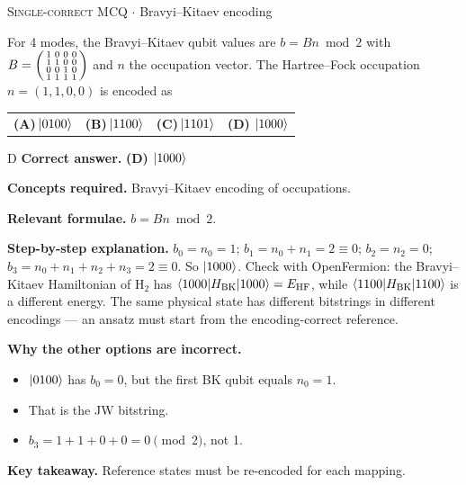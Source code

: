 \documentclass[11pt,a4paper]{article}
\newcommand{\optlabel}[1]{\textbf{(#1)}}
\newcommand{\correctlabel}[1]{\textcolor{okgreen}{\textbf{(#1)}\,\ding{51}}}
\newenvironment{qitem}[1]{\begin{list}{}{\setlength{\leftmargin}{3.3em}\setlength{\labelwidth}{3.1em}%
  \setlength{\labelsep}{0.2em}\setlength{\topsep}{3pt}\setlength{\parsep}{3pt}}\item[\textbf{Q.#1}\hfill]}{\end{list}}
\newcommand{\qsep}{\par\vspace{2pt}{\color{black!15}\hrule}\vspace{4pt}}
\newcommand{\qmeta}[2]{{\footnotesize\color{black!60}\textsc{#1} \;$\cdot$\; #2}\par}
\begin{document}
\begin{qitem}{65}
\qmeta{Single-correct MCQ}{Bravyi--Kitaev encoding}
For 4 modes, the Bravyi--Kitaev qubit values are $b = Bn \bmod 2$ with $B = \begin{psmallmatrix}1&0&0&0\\1&1&0&0\\0&0&1&0\\1&1&1&1\end{psmallmatrix}$ and $n$ the occupation vector.
The Hartree--Fock occupation $n = (1, 1, 0, 0)$ is encoded as
\par\smallskip\noindent\begin{tabularx}{\linewidth}{@{}*{4}{L}@{}}
\optlabel{A}\,$\ket{0100}$ & \optlabel{B}\,$\ket{1100}$ & \optlabel{C}\,$\ket{1101}$ & \correctlabel{D}\,$\ket{1000}$
\end{tabularx}
\end{qitem}
\begin{solbox}{D}
\textbf{\color{brand}Correct answer.} \textcolor{okgreen}{\textbf{(D)}} $\ket{1000}$

\textbf{\color{brand}Concepts required.} Bravyi--Kitaev encoding of occupations.

\textbf{\color{brand}Relevant formulae.} $b = Bn \bmod 2$.

\textbf{\color{brand}Step-by-step explanation.} $b_0 = n_0 = 1$; $b_1 = n_0 + n_1 = 2 \equiv 0$; $b_2 = n_2 = 0$; $b_3 = n_0 + n_1 + n_2 + n_3 = 2 \equiv 0$. So $\ket{1000}$.
Check with OpenFermion: the Bravyi--Kitaev Hamiltonian of H$_2$ has $\braket{1000|H_{\mathrm{BK}}|1000} = E_{\mathrm{HF}}$, while $\braket{1100|H_{\mathrm{BK}}|1100}$ is a different
energy. The same physical state has different bitstrings in different encodings --- an ansatz must start from the encoding-correct reference.

\textbf{\color{brand}Why the other options are incorrect.}
\begin{itemize}[leftmargin=2.4em, itemsep=1pt, topsep=2pt]
\item[\textbf{(A)}] $\ket{0100}$ has $b_0 = 0$, but the first BK qubit equals $n_0 = 1$.
\item[\textbf{(B)}] That is the JW bitstring.
\item[\textbf{(C)}] $b_3 = 1 + 1 + 0 + 0 = 0 \pmod 2$, not 1.
\end{itemize}
\textbf{\color{brand}Key takeaway.} Reference states must be re-encoded for each mapping.
\end{solbox}
\qsep
\end{document}

